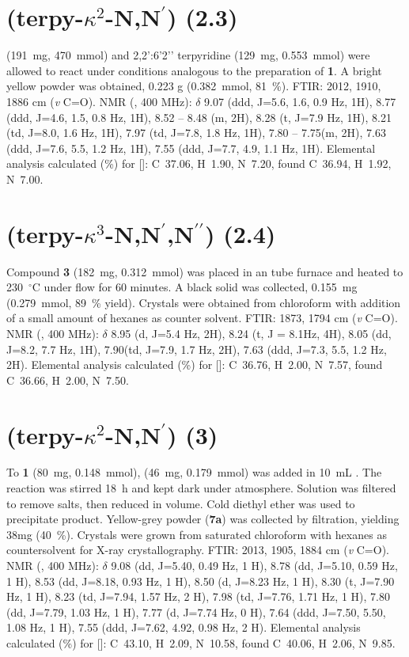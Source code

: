 \section{(terpy-$\kappa^2$-N,N$^\prime$) (2.3)}\label{sec.c3}
 (191~mg, 470~mmol) and 2,2’:6’2’’ terpyridine (129~mg, 0.553~mmol) were allowed to react under conditions analogous to the preparation of \textbf{1}. A bright yellow powder was obtained, 0.223 g (0.382~mmol, 81~\%). FTIR: 2012, 1910, 1886 cm (\textit{v} C=O).  NMR (, 400 MHz): $\delta$ 9.07 (ddd, J=5.6, 1.6, 0.9 Hz, 1H), 8.77 (ddd, J=4.6, 1.5, 0.8 Hz, 1H), 8.52 – 8.48 (m, 2H), 8.28 (t, J=7.9 Hz, 1H), 8.21 (td, J=8.0, 1.6 Hz, 1H), 7.97 (td, J=7.8, 1.8 Hz, 1H), 7.80 – 7.75(m, 2H), 7.63 (ddd, J=7.6, 5.5, 1.2 Hz, 1H), 7.55 (ddd, J=7.7, 4.9, 1.1 Hz, 1H). Elemental analysis calculated (\%) for []: C~37.06, H~1.90, N~7.20, found C~36.94, H~1.92, N~7.00.  

\section{(terpy-$\kappa^3$-N,N$^\prime$,N$^{\prime \prime}$) (2.4)}\label{sec.c4}
Compound \textbf{3} (182~mg, 0.312~mmol) was placed in an tube furnace and heated to 230~$^\circ$C under  flow for 60 minutes. A black solid was collected, 0.155~mg (0.279~mmol, 89~\% yield). Crystals were obtained from chloroform with addition of a small amount of hexanes as counter solvent. FTIR: 1873, 1794 cm (\textit{v} C=O).  NMR (, 400 MHz): $\delta$ 8.95 (d, J=5.4 Hz, 2H), 8.24 (t, J = 8.1Hz, 4H), 8.05 (dd, J=8.2, 7.7 Hz, 1H), 7.90(td, J=7.9, 1.7 Hz, 2H), 7.63 (ddd, J=7.3, 5.5, 1.2 Hz, 2H). Elemental analysis calculated (\%) for []: C~36.76, H~2.00, N~7.57, found C~36.66, H~2.00, N~7.50.

\section{(terpy-$\kappa^2$-N,N$^\prime$) (3)} \label{sec.c5}
To \textbf{1} (80~mg, 0.148~mmol),  (46~mg, 0.179~mmol) was added in 10~mL . The reaction was stirred 18~h and kept dark under  atmosphere. Solution was filtered to remove salts, then reduced in volume. Cold diethyl ether was used to precipitate product. Yellow-grey powder (\textbf{7a}) was collected by filtration, yielding 38mg (40~\%). Crystals were grown from saturated chloroform with hexanes as countersolvent for X-ray crystallography. FTIR: 2013, 1905, 1884 cm (\textit{v} C=O).  NMR (, 400 MHz): $\delta$ 9.08 (dd, J=5.40, 0.49 Hz, 1 H), 8.78 (dd, J=5.10, 0.59 Hz, 1 H), 8.53 (dd, J=8.18, 0.93 Hz, 1 H), 8.50 (d, J=8.23 Hz, 1 H), 8.30 (t, J=7.90 Hz, 1 H), 8.23 (td, J=7.94, 1.57 Hz, 2 H), 7.98 (td, J=7.76, 1.71 Hz, 1 H), 7.80 (dd, J=7.79, 1.03 Hz, 1 H), 7.77 (d, J=7.74 Hz, 0 H), 7.64 (ddd, J=7.50, 5.50, 1.08 Hz, 1 H), 7.55 (ddd, J=7.62, 4.92, 0.98 Hz, 2 H).  Elemental analysis calculated (\%) for []: C~43.10, H~2.09, N~10.58, found C~40.06, H~2.06, N~9.85.

